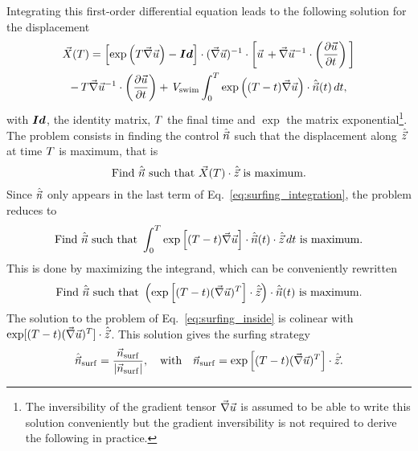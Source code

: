 Integrating this first-order differential equation leads to the following solution for the displacement
\begin{multline}
	\label{eq:surfing_integration}
	\vec{X}(T) =
	\left[ \exp \left( T \vec{\nabla} \vec{u} \right) - \boldsymbol{Id} \right] \cdot (\vec{\nabla} \vec{u})^{-1} \cdot \left[ \vec{u} \, + \vec{\nabla} \vec{u}^{-1} \cdot \left(\frac{\partial \vec{u}}{\partial t} \right) \, \right] \\
	- \, T \vec{\nabla} \vec{u}^{-1} \cdot \left(\frac{\partial \vec{u}}{\partial t} \right)
	+ \, V_{\mathrm{swim}} \int_{0}^{T} \exp \left( (T - t) \vec{\nabla} \vec{u} \right) \cdot\hat{\vec{n}}(t) \, dt ,
\end{multline}
with $\boldsymbol{Id}$, the identity matrix, $T$ the final time and $\exp$ the matrix exponential\footnote{The inversibility of the gradient tensor $\vec{\nabla} \vec{u}$ is assumed to be able to write this solution conveniently but the gradient inversibility is not required to derive the following in practice.}.
The problem consists in finding the control $\hat{\vec{n}}$ such that the displacement along $\hat{\vec{z}}$ at time $T$ is maximum, that is
\begin{equation}
	\text{Find} ~ \hat{\vec{n}} ~ \text{such that} ~ \vec{X}(T) \cdot \hat{\vec{z}} ~ \text{is maximum}.
\end{equation}
Since $\hat{\vec{n}}$ only appears in the last term of Eq.~\eqref{eq:surfing_integration}, the problem reduces to
\begin{equation}
	\text{Find} ~ \hat{\vec{n}} ~ \text{such that} ~ \int_{0}^{T} \exp \left[ (T - t) \vec{\nabla} \vec{u} \right] \cdot\hat{\vec{n}}(t) \cdot \hat{\vec{z}} \, dt ~ \text{is maximum}.
\end{equation}
This is done by maximizing the integrand, which can be conveniently rewritten
\begin{equation}
	\label{eq:surfing_inside}
	\text{Find} ~ \hat{\vec{n}} ~ \text{such that} ~ \left( \exp \left[ (T - t) (\vec{\nabla} \vec{u})^T \right] \cdot\hat{\vec{z}} \right) \cdot \hat{\vec{n}}(t) ~ \text{is maximum}.
\end{equation}
The solution to the problem of Eq.~\eqref{eq:surfing_inside} is colinear with $\exp [ (T - t) (\vec{\nabla} \vec{u})^T ] \cdot \hat{\vec{z}}$. 
This solution gives the surfing strategy
\begin{equation}
	\label{eq:surfing_optimal_swimming_direction}
	\hat{\vec{n}}_{\mathrm{surf}} = \frac{\vec{n}_{\mathrm{surf}}}{\lvert\vec{n}_{\mathrm{surf}}\rvert}, \quad \text{with} \quad \vec{n}_{\mathrm{surf}} = \exp \left[ (T - t) (\vec{\nabla} \vec{u})^T \right] \cdot \hat{\vec{z}}.
\end{equation}
